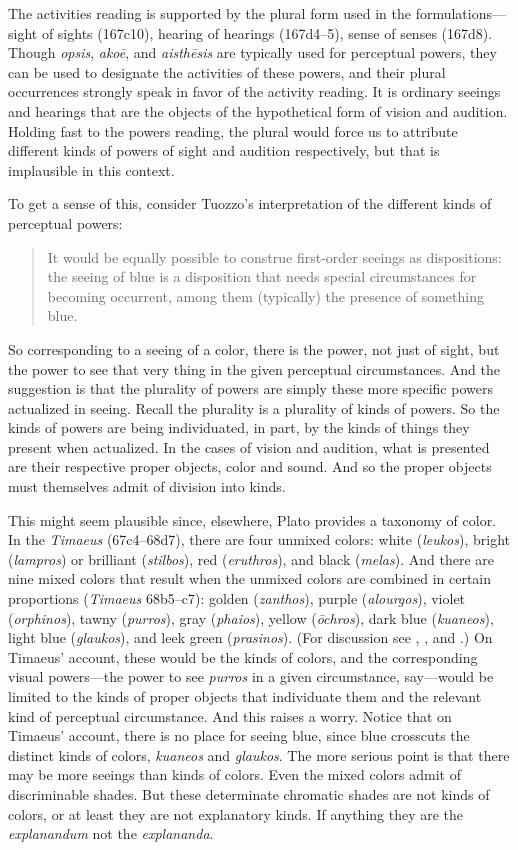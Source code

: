 The activities reading is supported by the plural form used in the formulations—sight of sights (167c10), hearing of hearings (167d4–5), sense of senses (167d8). Though \emph{opsis}, \emph{akoē}, and \emph{aisthēsis} are typically used for perceptual powers, they can be used to designate the activities of these powers, and their plural occurrences strongly speak in favor of the activity reading. It is ordinary seeings and hearings that are the objects of the hypothetical form of vision and audition. Holding fast to the powers reading, the plural would force us to attribute different kinds of powers of sight and audition respectively, but that is implausible in this context. 

To get a sense of this, consider Tuozzo's interpretation of the different kinds of perceptual powers:
\begin{quote}
	It would be equally possible to construe first-order seeings as dispositions: the seeing of blue is a disposition that needs special circumstances for becoming occurrent, among them (typically) the presence of something blue. \citep[219]{Tuozzo:2011aa}
\end{quote}
So corresponding to a seeing of a color, there is the power, not just of sight, but the power to see that very thing in the given perceptual circumstances. And the suggestion is that the plurality of powers are simply these more specific powers actualized in seeing. Recall the plurality is a plurality of kinds of powers. So the kinds of powers are being individuated, in part, by the kinds of things they present when actualized. In the cases of vision and audition, what is presented are their respective proper objects, color and sound. And so the proper objects must themselves admit of division into kinds. 

This might seem plausible since, elsewhere, Plato provides a taxonomy of color. In the \emph{Timaeus} (67c4–68d7), there are four unmixed colors: white (\emph{leukos}), bright (\emph{lampros}) or brilliant (\emph{stilbos}), red (\emph{eruthros}), and black (\emph{melas}). And there are nine mixed colors that result when the unmixed colors are combined in certain proportions (\emph{Timaeus} 68b5–c7): golden (\emph{zanthos}), purple (\emph{alourgos}), violet (\emph{orphinos}), tawny (\emph{purros}), gray (\emph{phaios}), yellow (\emph{ōchros}), dark blue (\emph{kuaneos}), light blue (\emph{glaukos}), and leek green (\emph{prasinos}). (For discussion see \citealt{James:1996pb}, \citealt{Ierodiakonou:2005ly}, and \citealt{Kalderon:2022kl}.) On Timaeus' account, these would be the kinds of colors, and the corresponding visual powers—the power to see \emph{purros} in a given circumstance, say—would be limited to the kinds of proper objects that individuate them and the relevant kind of perceptual circumstance. And this raises a worry. Notice that on Timaeus' account, there is no place for seeing blue, since blue crosscuts the distinct kinds of colors, \emph{kuaneos} and \emph{glaukos}. The more serious point is that there may be more seeings than kinds of colors. Even the mixed colors admit of discriminable shades. But these determinate chromatic shades are not kinds of colors, or at least they are not explanatory kinds. If anything they are the \emph{explanandum} not the \emph{explananda}.

